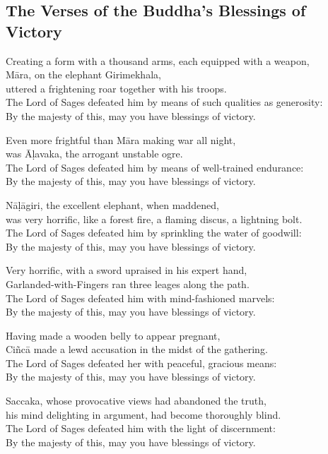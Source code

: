 \subsection{The Verses of the Buddha's Blessings of Victory}


Creating a form with a thousand arms, each equipped with a weapon,\\
Māra, on the elephant Girimekhala,\\
uttered a frightening roar together with his troops.\\
The Lord of Sages defeated him by means of such qualities as generosity:\\
By the majesty of this, may you have blessings of victory.

Even more frightful than Māra making war all night,\\
was Āḷavaka, the arrogant unstable ogre.\\
The Lord of Sages defeated him by means of well-trained endurance:\\
By the majesty of this, may you have blessings of victory.

Nāḷāgiri, the excellent elephant, when maddened,\\
was very horrific, like a forest fire, a flaming discus, a lightning bolt.\\
The Lord of Sages defeated him by sprinkling the water of goodwill:\\
By the majesty of this, may you have blessings of victory.

Very horrific, with a sword upraised in his expert hand,\\
Garlanded-with-Fingers ran three leages along the path.\\
The Lord of Sages defeated him with mind-fashioned marvels:\\
By the majesty of this, may you have blessings of victory.

Having made a wooden belly to appear pregnant,\\
Ciñcā made a lewd accusation in the midst of the gathering.\\
The Lord of Sages defeated her with peaceful, gracious means:\\
By the majesty of this, may you have blessings of victory.

Saccaka, whose provocative views had abandoned the truth,\\
his mind delighting in argument, had become thoroughly blind.\\
The Lord of Sages defeated him with the light of discernment:\\
By the majesty of this, may you have blessings of victory.

